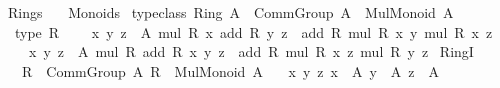 %
\begin{isabellebody}%
%
%
\isadelimdocument
%
\endisadelimdocument
%
\isatagdocument
\isanewline
%
\isamarkuptrue%
%
\endisatagdocument
{\isafolddocument}%
%
\isadelimdocument
%
\endisadelimdocument
%
\isadelimtheory
%
\endisadelimtheory
%
\isatagtheory
{}\isamarkupfalse%
\ Rings\isanewline
\ \ \ Monoids\isanewline
{}%
\endisatagtheory
{\isafoldtheory}%
%
\isadelimtheory
\isanewline
%
\endisadelimtheory
\isanewline
{}\isamarkupfalse%
\ {\isacharbrackleft}{\kern0pt}typeclass{\isacharbrackright}{\kern0pt}{\isacharcolon}{\kern0pt}\ {\isachardoublequoteopen}Ring\ A\ {\isasymequiv}\ Comm{\isacharunderscore}{\kern0pt}Group\ A\ {\isacharampersand}{\kern0pt}\ Mul{\isacharunderscore}{\kern0pt}Monoid\ A\ {\isacharampersand}{\kern0pt}\isanewline
\ \ type\ {\isacharparenleft}{\kern0pt}{\isasymlambda}R{\isachardot}{\kern0pt}\isanewline
\ \ \ \ {\isacharparenleft}{\kern0pt}{\isasymforall}x\ y\ z\ {\isacharcolon}{\kern0pt}\ A{\isachardot}{\kern0pt}\ mul\ R\ x\ {\isacharparenleft}{\kern0pt}add\ R\ y\ z{\isacharparenright}{\kern0pt}\ {\isacharequal}{\kern0pt}\ add\ R\ {\isacharparenleft}{\kern0pt}mul\ R\ x\ y{\isacharparenright}{\kern0pt}\ {\isacharparenleft}{\kern0pt}mul\ R\ x\ z{\isacharparenright}{\kern0pt}{\isacharparenright}{\kern0pt}\ {\isasymand}\isanewline
\ \ \ \ {\isacharparenleft}{\kern0pt}{\isasymforall}x\ y\ z\ {\isacharcolon}{\kern0pt}\ A{\isachardot}{\kern0pt}\ mul\ R\ {\isacharparenleft}{\kern0pt}add\ R\ x\ y{\isacharparenright}{\kern0pt}\ z\ {\isacharequal}{\kern0pt}\ add\ R\ {\isacharparenleft}{\kern0pt}mul\ R\ x\ z{\isacharparenright}{\kern0pt}\ {\isacharparenleft}{\kern0pt}mul\ R\ y\ z{\isacharparenright}{\kern0pt}{\isacharparenright}{\kern0pt}{\isacharparenright}{\kern0pt}{\isachardoublequoteclose}\isanewline
\isanewline
{}\isamarkupfalse%
\ RingI{\isacharcolon}{\kern0pt}\isanewline
\ \ \ {\isachardoublequoteopen}R\ {\isacharcolon}{\kern0pt}\ Comm{\isacharunderscore}{\kern0pt}Group\ A{\isachardoublequoteclose}\ {\isachardoublequoteopen}R\ {\isacharcolon}{\kern0pt}\ Mul{\isacharunderscore}{\kern0pt}Monoid\ A{\isachardoublequoteclose}\isanewline
\ \ \ {\isachardoublequoteopen}{\isasymAnd}x\ y\ z{\isachardot}{\kern0pt}\ {\isasymlbrakk}x\ {\isacharcolon}{\kern0pt}\ A{\isacharsemicolon}{\kern0pt}\ y\ {\isacharcolon}{\kern0pt}\ A{\isacharsemicolon}{\kern0pt}\ z\ {\isacharcolon}{\kern0pt}\ A{\isasymrbrakk}\ {\isasymLongrightarrow}\isanewline

\end{isabellebody}
